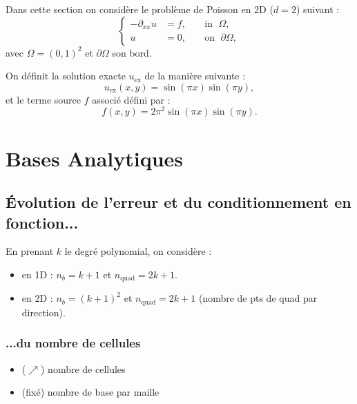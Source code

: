 \documentclass[12pt,a4paper]{article}
\begin{document}
Dans cette section on considère le problème de Poisson en 2D ($d=2$) suivant :
\begin{equation*}
    \left\{
    \begin{aligned}
        -\partial_{xx} u & = f, \; &  & \text{in } \; \Omega,         \\
        u                & = 0, \; &  & \text{on } \; \partial\Omega,
    \end{aligned}
    \right.
\end{equation*}
avec $\Omega=(0,1)^2$ et $\partial\Omega$ son bord.

On définit la solution exacte $u_\text{ex}$ de la manière suivante :
\begin{equation*}
    u_{\text{ex}}(x,y) = \sin(\pi x)\sin(\pi y),
\end{equation*}
et le terme source $f$ associé défini par :
\begin{equation*}
    f(x,y) = 2\pi^2 \sin(\pi x)\sin(\pi y).
\end{equation*}

\newpage
\section{Bases Analytiques}

\subsection{Évolution de l'erreur et du conditionnement en fonction...}

En prenant $k$ le degré polynomial, on considère :
\begin{itemize}
    \item en 1D : $n_b = k+1$ et $n_\text{quad} = 2k + 1$.
    \item en 2D : $n_b = (k+1)^2$ et $n_\text{quad} = 2k + 1$ (nombre de pts de quad par direction).
\end{itemize}

\subsubsection{...du nombre de cellules}

\begin{itemize}
    \item ($\nearrow$) nombre de cellules
    \item (fixé) nombre de base par maille
\end{itemize}
\end{document}
